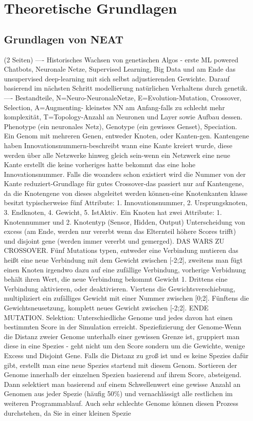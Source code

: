 \chapter{Theoretische Grundlagen}
\label{chapter:2}

\section{Grundlagen von NEAT}
(2 Seiten)
---- Historisches Wachsen von genetischen Algos - erste ML powered Chatbots, Neuronale Netze, Supervised Learning, Big Data und am Ende das unsupervised deep-learning mit sich selbst adjustierenden Gewichte. Darauf basierend im nächsten Schritt modellierung natürlichen Verhaltens durch genetik. 
---- Bestandteile, N=Neuro-NeuronaleNetze, E=Evolution-Mutation, Crossover, Selection, A=Augmenting- kleinstes NN am Anfang-falls zu schlecht mehr komplexität, T=Topology-Anzahl an Neuronen und Layer sowie Aufbau dessen. Phenotype (ein neuronales Netz), Genotype (ein gewisses Genset), Speciation. Ein Genom mit mehreren Genen, entweder Knoten, oder Kanten-gen. Kantengene haben Innovationsnummern-beschreibt wann eine Kante kreiert wurde, diese werden über alle Netzwerke hinweg gleich sein-wenn ein Netzwerk eine neue Kante erstellt die keine vorheriges hatte bekommt das eine hohe Innovationsnummer. Falls die woanders schon existiert wird die Nummer von der Kante reduziert-Grundlage für gutes Crossover-das passiert nur auf Kantengene, da die Knotengene von dieses abgeleitet werden können-eine Knotenkanten klasse besitzt typischerweise fünf Attribute: 1. Innovationsnummer, 2. Ursprungsknoten, 3. Endknoten, 4. Gewicht, 5. IstAktiv. Ein Knoten hat zwei Attribute: 1. Knotennummer und 2. Knotentyp (Sensor, Hidden, Output) Unterscheidung von excess (am Ende, werden nur vererbt wenn das Elternteil höhere Scores trifft) und disjoint gene (werden immer vererbt und gemerged). DAS WARS ZU CROSSOVER. Fünf Mutations typen, entweder eine Verbindung mutieren das heißt eine neue Verbindung mit dem Gewicht zwischen [-2;2], zweitens man fügt einen Knoten irgendwo dazu auf eine zufällige Verbindung, vorherige Verbidnung behält ihren Wert, die neue Verbindung bekommt Gewicht 1. Drittens eine Verbindung aktivieren, oder deaktivieren. Viertens die Gewichtsverschiebung, multipliziert ein zufälliges Gewicht mit einer Nummer zwischen [0;2]. Fünftens die Gewichtsneusetzung, komplett neues Gewicht zwischen [-2;2]. ENDE MUTATION. Selektion: Unterschiedliche Genome und jedes davon hat einen bestimmten Score in der Simulation erreicht. Speziefizierung  der Genome-Wenn die Distanz zweier Genome unterhalb einer gewissen Grenze ist, gruppiert man diese in eine Spezies - geht nicht um den Score sondern um die Gewichte, wenige Excess und Disjoint Gene. Falls die Distanz zu groß ist und es keine Spezies dafür gibt, erstellt man eine neue Spezies startend mit diesem Genom. Sortieren der Genome innerhalb der einzelnen Spezien basierend auf ihrem Score, absteigend. Dann selektiert man basierend auf einem Schwellenwert eine gewisse Anzahl an Genomen aus jeder Spezie (häufig 50\%) und vernachlässigt alle restlichen im weiteren Programmablauf. Auch sehr schlechte Genome können diesen Prozess durchstehen, da Sie in einer kleinen Spezie 
